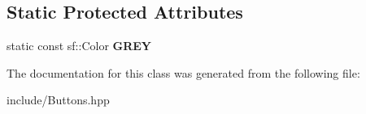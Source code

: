 \subsection*{Static Protected Attributes}
\begin{DoxyCompactItemize}
\item 
\mbox{\label{class_button_afc0927052e6f57f0cfc7521953421617}} 
static const sf\+::\+Color {\bfseries G\+R\+EY}
\end{DoxyCompactItemize}


The documentation for this class was generated from the following file\+:\begin{DoxyCompactItemize}
\item 
include/Buttons.\+hpp\end{DoxyCompactItemize}
